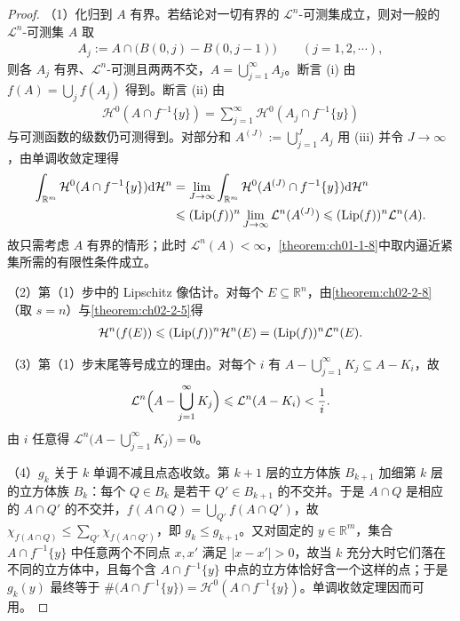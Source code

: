 \documentclass[../../main.tex]{subfiles}%
\begin{document}
\begin{proof}
（1）化归到 $A$ 有界。若结论对一切有界的 $\mathcal{L}^n$-可测集成立，则对一般的 $\mathcal{L}^n$-可测集 $A$ 取
\begin{align*}
A_j:=A\cap\bigl(B(0,j)-B(0,j-1)\bigr)\qquad(j=1,2,\cdots),
\end{align*}
则各 $A_j$ 有界、$\mathcal{L}^n$-可测且两两不交，$A=\bigcup_{j=1}^{\infty}A_j$。断言 (i) 由 $f(A)=\bigcup_{j}f(A_j)$ 得到。断言 (ii) 由
\begin{align*}
\mathcal{H}^0(A\cap f^{-1}\{y\})=\sum_{j=1}^{\infty}\mathcal{H}^0(A_j\cap f^{-1}\{y\})
\end{align*}
与可测函数的级数仍可测得到。对部分和 $A^{(J)}:=\bigcup_{j=1}^{J}A_j$ 用 (iii) 并令 $J\to\infty$，由单调收敛定理得
\begin{align*}
\int_{\mathbb{R}^m}\mathcal{H}^0(A\cap f^{-1}\{y\})\mathrm{d}\mathcal{H}^n
&=\lim_{J\to\infty}\int_{\mathbb{R}^m}\mathcal{H}^0(A^{(J)}\cap f^{-1}\{y\})\mathrm{d}\mathcal{H}^n\\
&\leqslant(\operatorname{Lip}(f))^n\lim_{J\to\infty}\mathcal{L}^n(A^{(J)})\leqslant(\operatorname{Lip}(f))^n\mathcal{L}^n(A).
\end{align*}
故只需考虑 $A$ 有界的情形；此时 $\mathcal{L}^n(A)<\infty$，\cref{theorem:ch01-1-8}中取内逼近紧集所需的有限性条件成立。%

（2）第（1）步中的 Lipschitz 像估计。对每个 $E\subseteq\mathbb{R}^n$，由\cref{theorem:ch02-2-8}（取 $s=n$）与\cref{theorem:ch02-2-5}得%
\begin{align*}
\mathcal{H}^n(f(E))\leqslant(\operatorname{Lip}(f))^n\mathcal{H}^n(E)=(\operatorname{Lip}(f))^n\mathcal{L}^n(E).
\end{align*}

（3）第（1）步末尾等号成立的理由。对每个 $i$ 有 $A-\bigcup_{j=1}^{\infty}K_j\subseteq A-K_i$，故
\begin{align*}
\mathcal{L}^n\Bigl(A-\bigcup_{j=1}^{\infty}K_j\Bigr)\leqslant\mathcal{L}^n(A-K_i)<\frac1i .
\end{align*}
由 $i$ 任意得 $\mathcal{L}^n\bigl(A-\bigcup_{j=1}^{\infty}K_j\bigr)=0$。

（4）$g_k$ 关于 $k$ 单调不减且点态收敛。第 $k+1$ 层的立方体族 $B_{k+1}$ 加细第 $k$ 层的立方体族 $B_k$：每个 $Q\in B_k$ 是若干 $Q'\in B_{k+1}$ 的不交并。于是 $A\cap Q$ 是相应的 $A\cap Q'$ 的不交并，$f(A\cap Q)=\bigcup_{Q'}f(A\cap Q')$，故 $\chi_{f(A\cap Q)}\leqslant\sum_{Q'}\chi_{f(A\cap Q')}$，即 $g_k\leqslant g_{k+1}$。又对固定的 $y\in\mathbb{R}^m$，集合 $A\cap f^{-1}\{y\}$ 中任意两个不同点 $x,x'$ 满足 $\lvert x-x'\rvert>0$，故当 $k$ 充分大时它们落在不同的立方体中，且每个含 $A\cap f^{-1}\{y\}$ 中点的立方体恰好含一个这样的点；于是 $g_k(y)$ 最终等于 $\#\bigl(A\cap f^{-1}\{y\}\bigr)=\mathcal{H}^0(A\cap f^{-1}\{y\})$。单调收敛定理因而可用。
\end{proof}
\end{document}
